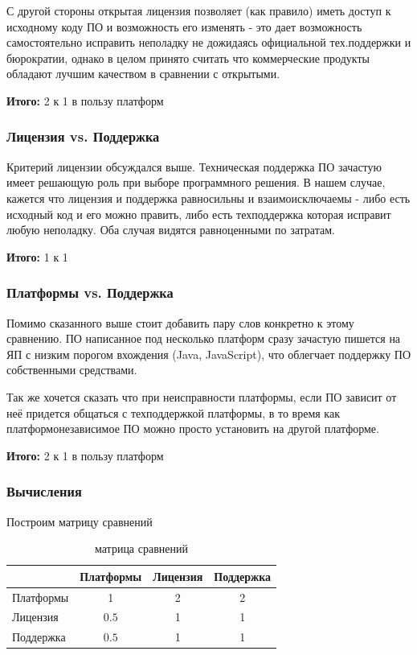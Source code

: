 \documentclass[a4paper,12pt]{report} %
\begin{document}
С другой стороны открытая лицензия позволяет (как правило) иметь доступ к
исходному коду ПО и возможность его изменять - это дает возможность
самостоятельно исправить неполадку не дожидаясь официальной тех.поддержки и
бюрократии, однако в целом принято считать что коммерческие продукты обладают
лучшим качеством в сравнении с открытыми.

\textbf{Итого:} 2 к 1 в пользу платформ

\subsubsection{Лицензия vs. Поддержка}

Критерий лицензии обсуждался выше. Техническая поддержка ПО зачастую имеет
решающую роль при выборе программного решения. В нашем случае, кажется что
лицензия и поддержка равносильны и взаимоисключаемы - либо есть исходный код и
его можно править, либо есть техподдержка которая исправит любую неполадку. Оба
случая видятся равноценными по затратам.

\textbf{Итого:} 1 к 1

\subsubsection{Платформы vs. Поддержка}

Помимо сказанного выше стоит добавить пару слов конкретно к этому сравнению. ПО
написанное под несколько платформ сразу зачастую пишется на ЯП с низким порогом
вхождения (Java, JavaScript), что облегчает поддержку ПО собственными
средствами.

Так же хочется сказать что при неисправности платформы, если ПО зависит от неё
придется общаться с техподдержкой платформы, в то время как платформонезависимое
ПО можно просто установить на другой платформе.

\textbf{Итого:} 2 к 1 в пользу платформ

\subsubsection{Вычисления}

Построим матрицу сравнений
\begin{table}[h]
  \caption{матрица сравнений}
  \begin{tabular}{l|c|c|c|}
    \cline{2-4}
    {}                              & \multicolumn{1}{l|}{Платформы} & \multicolumn{1}{l|}{Лицензия} & \multicolumn{1}{l|}{Поддержка} \\ \hline
    \multicolumn{1}{|l|}{Платформы} & 1                              & 2                             & 2                              \\ \hline
    \multicolumn{1}{|l|}{Лицензия}  & $0.5$                          & 1                             & 1                              \\ \hline
    \multicolumn{1}{|l|}{Поддержка} & $0.5$                          & 1                             & 1                              \\ \hline
  \end{tabular}
\end{table}
\end{document}
